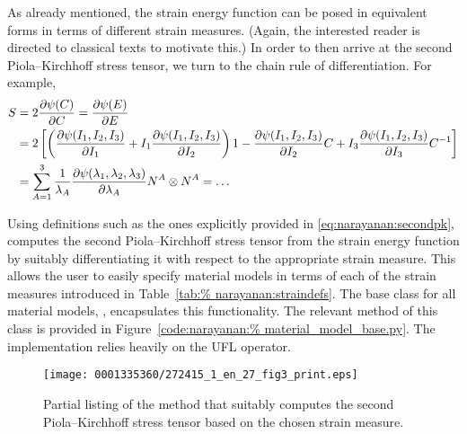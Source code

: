 As already mentioned, the strain energy function can be posed in
equivalent forms in terms of different strain measures. (Again, the
interested reader is directed to classical texts to motivate this.) In
order to then arrive at the second Piola--Kirchhoff stress tensor, we
turn to the chain rule of differentiation. For example,%
\begin{equation}
  \begin{split}
    \mbox{$ S$} & = 2 \frac{\partial \psi(\mbox{$ C$})}{\partial \mbox{$ C$}} =
    \frac{\partial \psi(\mbox{$ E$})}{\partial \mbox{$ E$}}\\
    & = 2\left[\left(\frac{\partial \psi (I_{1}, I_{2},
          I_{3})}{\partial I_{1}} + I_{1} \frac{\partial \psi (I_{1},
          I_{2}, I_{3})}{\partial I_{2}} \right) {1} -
      \frac{\partial \psi (I_{1}, I_{2}, I_{3})}{\partial I_{2}} \mbox{$ C$} +
      I_{3} \frac{\partial \psi (I_{1}, I_{2}, I_{3})}{\partial I_{3}}
      \mbox{$ C$}^{-1} \right]\\
    & = \sum_{A = 1}^{3} \frac{1}{\lambda_{A}} \frac{\partial
      \psi(\lambda_{1}, \lambda_{2}, \lambda_{3})}{\partial
      \lambda_{A}} \mbox{$ N$}^{A}\otimes\mbox{$ N$}^{A} = \ldots
  \end{split}
  \label{eq:narayanan:secondpk}
\end{equation}

Using definitions such as the ones explicitly provided in
\eqref{eq:narayanan:secondpk}, \twist{} computes the second
Piola--Kirchhoff stress tensor from the strain energy function by
suitably differentiating it with respect to the appropriate strain
measure. This allows the user to easily specify material models in
terms of each of the strain measures introduced in Table~\ref{tab:%
narayanan:straindefs}. The base class for all material models,
, encapsulates this functionality. The relevant
method of this class is provided in Figure~\ref{code:narayanan:%
material_model_base.py}. The implementation relies heavily on the UFL
 operator.

\begin{figure}[!t]
\texttt{[image: 0001335360/272415\_1\_en\_27\_fig3\_print.eps]}
\caption{Partial listing of the method that suitably computes the
  second Piola--Kirchhoff stress tensor based on the chosen strain
  measure.}
\label{code:narayanan:material_model_base.py}
\end{figure}

